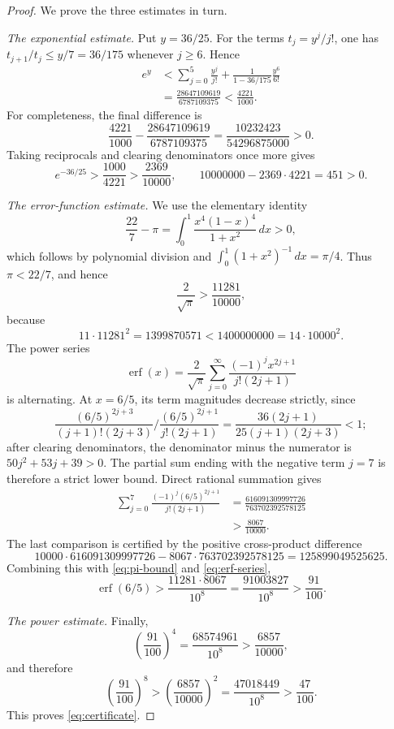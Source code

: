 \documentclass[11pt,reqno]{amsart}
\theoremstyle{remark}
\DeclareMathOperator{\erf}{erf}
\begin{document}
\begin{proof}
We prove the three estimates in turn.

\smallskip
\noindent
\emph{The exponential estimate.}
Put \(y=36/25\).  For the terms \(t_j=y^j/j!\), one has
\(t_{j+1}/t_j\le y/7=36/175\) whenever \(j\ge6\).  Hence
\begin{align*}
 e^y
 &<\sum_{j=0}^{5}\frac{y^j}{j!}
   +\frac{1}{1-36/175}\frac{y^6}{6!}\\
 &=\frac{28647109619}{6787109375}
 <\frac{4221}{1000}.
\end{align*}
For completeness, the final difference is
\[
 \frac{4221}{1000}
 -\frac{28647109619}{6787109375}
 =\frac{10232423}{54296875000}>0.
\]
Taking reciprocals and clearing denominators once more gives
\[
 e^{-36/25}>\frac{1000}{4221}>\frac{2369}{10000},
 \qquad
 10000000-2369\cdot4221=451>0.
\]

\smallskip
\noindent
\emph{The error-function estimate.}
We use the elementary identity
\[
 \frac{22}{7}-\pi
 =\int_0^1\frac{x^4(1-x)^4}{1+x^2}\,dx>0,
\]
which follows by polynomial division and
\(\int_0^1(1+x^2)^{-1}\,dx=\pi/4\).  Thus \(\pi<22/7\), and hence
\begin{equation}\label{eq:pi-bound}
 \frac2{\sqrt\pi}>\frac{11281}{10000},
\end{equation}
because
\[
 11\cdot11281^2=1399870571
 <1400000000=14\cdot10000^2.
\]
The power series
\begin{equation}\label{eq:erf-series}
 \erf(x)=\frac2{\sqrt\pi}
 \sum_{j=0}^{\infty}
 \frac{(-1)^j x^{2j+1}}{j!(2j+1)}
\end{equation}
is alternating.  At \(x=6/5\), its term magnitudes decrease strictly,
since
\[
 \frac{(6/5)^{2j+3}}{(j+1)!(2j+3)}
 \bigg/
 \frac{(6/5)^{2j+1}}{j!(2j+1)}
 =\frac{36(2j+1)}{25(j+1)(2j+3)}<1;
\]
after clearing denominators, the denominator minus the numerator is
\(50j^2+53j+39>0\).  The partial sum ending with the negative term
\(j=7\) is therefore a strict lower bound.  Direct rational summation gives
\begin{align*}
 \sum_{j=0}^{7}
 \frac{(-1)^j(6/5)^{2j+1}}{j!(2j+1)}
 &=\frac{616091309997726}{763702392578125}\\
 &>\frac{8067}{10000}.
\end{align*}
The last comparison is certified by the positive cross-product difference
\[
 10000\cdot616091309997726
 -8067\cdot763702392578125
 =125899049525625.
\]
Combining this with \eqref{eq:pi-bound} and \eqref{eq:erf-series},
\[
 \erf(6/5)
 >\frac{11281\cdot8067}{10^8}
 =\frac{91003827}{10^8}
 >\frac{91}{100}.
\]

\smallskip
\noindent
\emph{The power estimate.}
Finally,
\[
 \left(\frac{91}{100}\right)^4
 =\frac{68574961}{10^8}>\frac{6857}{10000},
\]
and therefore
\[
 \left(\frac{91}{100}\right)^8
 >\left(\frac{6857}{10000}\right)^2
 =\frac{47018449}{10^8}>\frac{47}{100}.
\]
This proves \eqref{eq:certificate}.
\end{proof}
\end{document}
